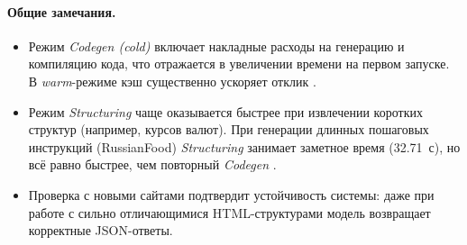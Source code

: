 \paragraph{Общие замечания.}
\begin{itemize}
    \item Режим \emph{Codegen (cold)} включает накладные расходы на генерацию и компиляцию кода, что отражается в увеличении времени на первом запуске. В \emph{warm}-режиме кэш существенно ускоряет отклик \cite{Dong2022CacheLLM}.
    \item Режим \emph{Structuring} чаще оказывается быстрее при извлечении коротких структур (например, курсов валют). При генерации длинных пошаговых инструкций (RussianFood) \emph{Structuring} занимает заметное время (32.71~с), но всё равно быстрее, чем повторный \emph{Codegen} \cite{Brown2020}.
    \item Проверка с новыми сайтами подтвердит устойчивость системы: даже при работе с сильно отличающимися HTML-структурами модель возвращает корректные JSON-ответы.
\end{itemize}
